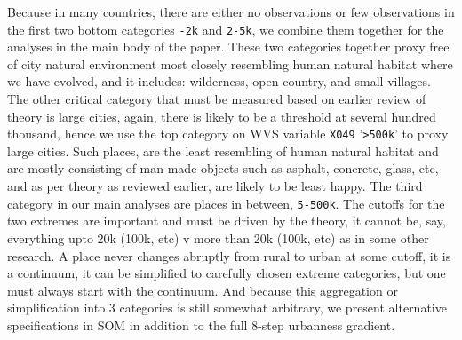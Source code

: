 \documentclass[10pt, letterpaper]{article}
\begin{document}
Because in many countries, there are either no observations or few observations
in the first two bottom categories \texttt{-2k} and \texttt{2-5k}, we combine
them together for the analyses in the main body of the paper. These two
categories together proxy free of city  natural
environment most closely resembling human natural habitat where we have evolved,
and it includes: wilderness, open country, and small villages. The other
critical category that must be measured based on earlier review of theory is large cities, again,
there is likely to be a threshold at several hundred thousand, hence we use the
top category on WVS variable \texttt{X049} '\texttt{>500k}' to proxy large
cities. Such places, are the least resembling of human natural habitat and are
mostly consisting of man made objects such as asphalt, concrete, glass, etc, and
as per theory as reviewed earlier, are likely to be least happy. The third
category in our main analyses are places in between, \texttt{5-500k}.
%
 The cutoffs for the two extremes are
 important and must be driven by the theory, it cannot be, say, everything upto
 20k (100k, etc) v more than 20k (100k, etc)  as in some other research. A place
 never changes abruptly from rural to urban at some cutoff, it is a continuum,
 it can be simplified to carefully chosen extreme categories, but one must
 always start with the continuum.
%
And because this aggregation or simplification into 3 categories is still
somewhat arbitrary, we present alternative specifications in SOM in addition to
the full 8-step urbanness gradient. 

\end{document}
